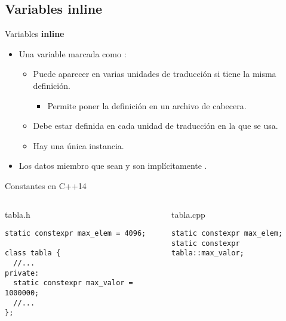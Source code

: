 \subsection{Variables inline}

\begin{frame}[t]{Variables \textbf{inline}}
\begin{itemize}
  \item Una variable marcada como :
    \begin{itemize}
      \item Puede aparecer en varias unidades de traducción si tiene
            la misma definición.
        \begin{itemize}
          \pause
          \item Permite poner la definición en un archivo de cabecera.
        \end{itemize}
      \pause
      \item Debe estar definida en cada unidad de traducción en la que
            se usa.
      \pause
      \item Hay una única instancia.
    \end{itemize}

  \vfill\pause
  \item Los datos miembro que sean  y  son
        implícitamente .
\end{itemize}
\end{frame}

\begin{frame}[t,fragile]{Constantes en C++14}
\begin{columns}[T]


\begin{block}{tabla.h}
\begin{lstlisting}
static constexpr max_elem = 4096;

class tabla {
  //...
private:
  static constexpr max_valor = 1000000;
  //...
};
\end{lstlisting}
\end{block}

\begin{block}{tabla.cpp}
\begin{lstlisting}
static constexpr max_elem;
static constexpr tabla::max_valor;
\end{lstlisting}
\end{block}

\end{columns}
\end{frame}


